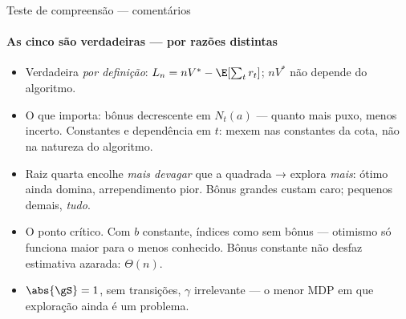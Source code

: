 \documentclass[aspectratio=169, 11pt]{beamer}
\begin{document}
\begin{frame}{Teste de compreensão --- comentários}
  \framesubtitle{As cinco são verdadeiras --- por razões distintas}
  {\footnotesize
  \begin{itemize}\setlength{\itemsep}{0.5ex}
    \item[\textbf{1.}] Verdadeira \emph{por definição}: $L_n = nV^{*} -
          \E[\sum_t r_t]$; $nV^{*}$ não depende do algoritmo.
    \item[\textbf{2.}] O que importa: bônus \alert{decrescente em
          $N_t(a)$} --- quanto mais puxo, menos incerto. Constantes e
          dependência em $t$: mexem nas constantes da cota, não na natureza
          do algoritmo.
    \item[\textbf{3.}] Raiz quarta encolhe \emph{mais devagar} que a
          quadrada → explora \emph{mais}: ótimo ainda domina, arrependimento
          pior. Bônus grandes custam caro; pequenos demais, \emph{tudo}.
    \item[\textbf{4.}] O ponto crítico. Com $b$ constante, índices como sem
          bônus --- otimismo só funciona \alert{maior para o menos
          conhecido}. Bônus constante não desfaz estimativa azarada:
          $\Theta(n)$.
    \item[\textbf{5.}] $\abs{\gS}=1$, sem transições, $\gamma$ irrelevante
          --- o menor MDP em que exploração ainda é um problema.
  \end{itemize}}
\end{frame}
\end{document}

